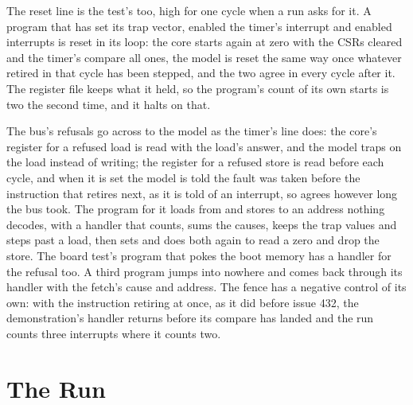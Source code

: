 \documentclass[journal,onecolumn,9pt]{IEEEtran}
\begin{document}
The reset line is the test's too, high for one cycle when a run asks
for it. A program that has set its trap vector, enabled the timer's
interrupt and enabled interrupts is reset in its loop: the core starts
again at zero with the CSRs cleared and the timer's compare all ones,
the model is reset the same way once whatever retired in that cycle
has been stepped, and the two agree in every cycle after it. The
register file keeps what it held, so the program's count of its own
starts is two the second time, and it halts on that.

The bus's refusals go across to the model as the timer's line does:
the core's register for a refused load is read with the load's
answer, and the model traps on the load instead of writing; the
register for a refused store is read before each cycle, and when it
is set the model is told the fault was taken before the instruction
that retires next, as it is told of an interrupt, so 
agrees however long the bus took. The program for it loads from and
stores to an address nothing decodes, with a handler that counts,
sums the causes, keeps the trap values and steps past a load, then
sets  and does both again to read a zero and drop the
store. The board test's program that pokes the boot memory has a
handler for the refusal too. A third program jumps into nowhere and
comes back through its handler with the fetch's cause and address.
The fence has a negative control of its own: with the instruction
retiring at once, as it did before issue 432, the demonstration's
handler returns before its compare has landed and the run counts
three interrupts where it counts two.



\section{The Run}
\label{sec:v-run}
\end{document}
